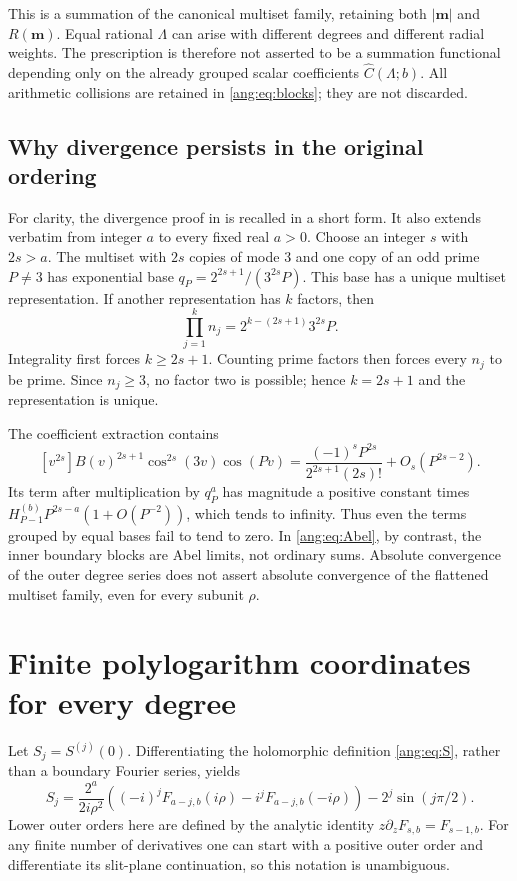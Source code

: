 \begin{remark}
This is a summation of the canonical multiset family, retaining both
$|\boldsymbol m|$ and $R(\boldsymbol m)$. Equal rational
$\Lambda$ can arise with different degrees and different radial
weights. The prescription is therefore not asserted to be a
summation functional depending only on the already grouped scalar
coefficients $\widehat C(\Lambda;b)$. All arithmetic collisions
are retained in \eqref{ang:eq:blocks}; they are not discarded.
\end{remark}

\subsection{Why divergence persists in the original ordering}

For clarity, the divergence proof in \cite{RepoFormal} is recalled
in a short form. It also extends verbatim from integer $a$ to every
fixed real $a>0$. Choose an integer $s$ with $2s>a$. The multiset
with $2s$ copies of mode $3$ and one copy of an odd prime $P\ne3$
has exponential base $q_P=2^{2s+1}/(3^{2s}P)$. This base has a
unique multiset representation. If another representation has $k$
factors, then
\[
 \prod_{j=1}^k n_j=2^{k-(2s+1)}3^{2s}P.
\]
Integrality first forces $k\ge2s+1$. Counting prime factors then
forces every $n_j$ to be prime. Since $n_j\ge3$, no factor two
is possible; hence $k=2s+1$ and the representation is unique.

The coefficient extraction contains
\[
 [v^{2s}]B(v)^{2s+1}\cos^{2s}(3v)\cos(Pv)
 =\frac{(-1)^sP^{2s}}{2^{2s+1}(2s)!}+O_s(P^{2s-2}).
\]
Its term after multiplication by $q_P^a$ has magnitude a positive
constant times
$H_{P-1}^{(b)}P^{2s-a}(1+O(P^{-2}))$, which tends to infinity.
Thus even the terms grouped by equal bases fail to tend to zero.
In \eqref{ang:eq:Abel}, by contrast, the inner boundary blocks
are Abel limits, not ordinary sums. Absolute convergence of the
outer degree series does not assert absolute convergence of the
flattened multiset family, even for every subunit $\rho$.

\section{Finite polylogarithm coordinates for every degree}
\label{ang:sec:periods}

Let $S_j=S^{(j)}(0)$. Differentiating the holomorphic definition
\eqref{ang:eq:S}, rather than a boundary Fourier series, yields
\begin{equation}
 S_j=\frac{2^a}{2i\rho^2}
 \left((-i)^jF_{a-j,b}(i\rho)-i^jF_{a-j,b}(-i\rho)\right)
 -2^j\sin(j\pi/2).
 \label{ang:eq:jets}
\end{equation}
Lower outer orders here are defined by the analytic identity
$z\partial_zF_{s,b}=F_{s-1,b}$. For any finite number of
derivatives one can start with a positive outer order and differentiate
its slit-plane continuation, so this notation is unambiguous.

